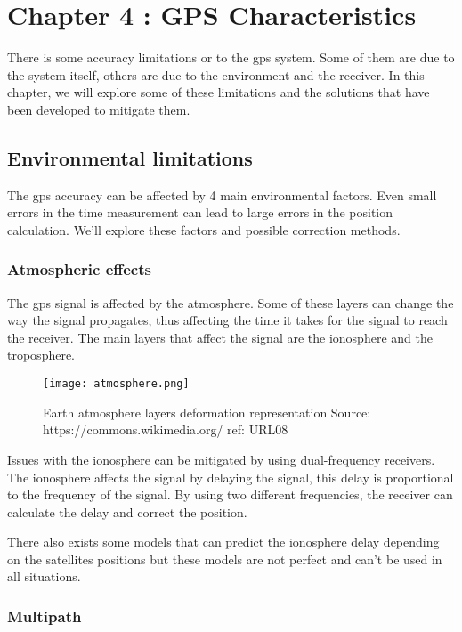 \chapter{Chapter 4 : GPS Characteristics}

There is some accuracy limitations or to the \gls{gps} system. Some of them are due to the system itself, others are due to the environment and the receiver. In this chapter, we will explore some of these limitations and the solutions that have been developed to mitigate them.

\section{Environmental limitations}

The \gls{gps} accuracy can be affected by 4 main environmental factors. Even small errors in the time measurement can lead to large errors in the position calculation. We'll explore these factors and possible correction methods.

\subsection{Atmospheric effects}

The \gls{gps} signal is affected by the atmosphere. Some of these layers can change the way the signal propagates, thus affecting the time it takes for the signal to reach the receiver. The main layers that affect the signal are the ionosphere and the troposphere.

\begin{figure}[H]
	\centering
	\texttt{[image: atmosphere.png]}
	\caption[Earth atmosphere layers deformation]{Earth atmosphere layers deformation representation Source: https://commons.wikimedia.org/ ref: URL08}
	\label{fig:earth_atmosphere}
\end{figure}

Issues with the ionosphere can be mitigated by using dual-frequency receivers. The ionosphere affects the signal by delaying the signal, this delay is proportional to the frequency of the signal. By using two different frequencies, the receiver can calculate the delay and correct the position.

There also exists some models that can predict the ionosphere delay depending on the satellites positions but these models are not perfect and can't be used in all situations.

\subsection{Multipath}

